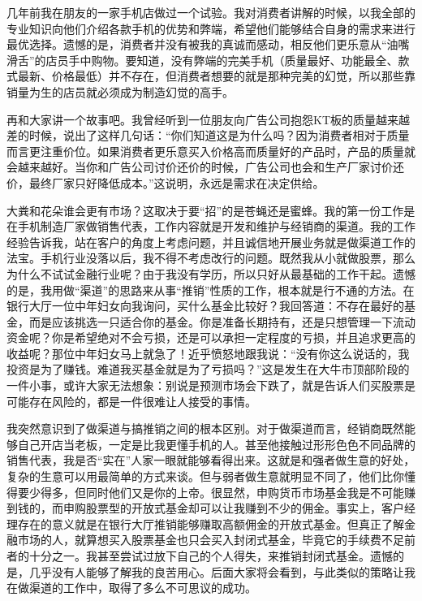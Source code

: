 几年前我在朋友的一家手机店做过一个试验。我对消费者讲解的时候，以我全部的专业知识向他们介绍各款手机的优势和弊端，希望他们能够结合自身的需求来进行最优选择。遗憾的是，消费者并没有被我的真诚而感动，相反他们更乐意从“油嘴滑舌”的店员手中购物。要知道，没有弊端的完美手机（质量最好、功能最全、款式最新、价格最低）并不存在，但消费者想要的就是那种完美的幻觉，所以那些靠销量为生的店员就必须成为制造幻觉的高手。

再和大家讲一个故事吧。我曾经听到一位朋友向广告公司抱怨KT板的质量越来越差的时候，说出了这样几句话：“你们知道这是为什么吗？因为消费者相对于质量而言更注重价位。如果消费者更乐意买入价格高而质量好的产品时，产品的质量就会越来越好。当你和广告公司讨价还价的时候，广告公司也会和生产厂家讨价还价，最终厂家只好降低成本。”这说明，永远是需求在决定供给。

大粪和花朵谁会更有市场？这取决于要“招”的是苍蝇还是蜜蜂。我的第一份工作是在手机制造厂家做销售代表，工作内容就是开发和维护与经销商的渠道。我的工作经验告诉我，站在客户的角度上考虑问题，并且诚信地开展业务就是做渠道工作的法宝。手机行业没落以后，我不得不考虑改行的问题。既然我从小就做股票，那么为什么不试试金融行业呢？由于我没有学历，所以只好从最基础的工作干起。遗憾的是，我用做“渠道”的思路来从事“推销”性质的工作，根本就是行不通的方法。在银行大厅一位中年妇女向我询问，买什么基金比较好？我回答道：不存在最好的基金，而是应该挑选一只适合你的基金。你是准备长期持有，还是只想管理一下流动资金呢？你是希望绝对不会亏损，还是可以承担一定程度的亏损，并且追求更高的收益呢？那位中年妇女马上就急了！近乎愤怒地跟我说：“没有你这么说话的，我投资是为了赚钱。难道我买基金就是为了亏损吗？”这是发生在大牛市顶部阶段的一件小事，或许大家无法想象：别说是预测市场会下跌了，就是告诉人们买股票是可能存在风险的，都是一件很难让人接受的事情。

我突然意识到了做渠道与搞推销之间的根本区别。对于做渠道而言，经销商既然能够自己开店当老板，一定是比我更懂手机的人。甚至他接触过形形色色不同品牌的销售代表，我是否“实在”人家一眼就能够看得出来。这就是和强者做生意的好处，复杂的生意可以用最简单的方式来谈。但与弱者做生意就明显不同了，他们比你懂得要少得多，但同时他们又是你的上帝。很显然，申购货币市场基金我是不可能赚到钱的，而申购股票型的开放式基金却可以让我赚到不少的佣金。事实上，客户经理存在的意义就是在银行大厅推销能够赚取高额佣金的开放式基金。但真正了解金融市场的人，就算想买入股票基金也只会买入封闭式基金，毕竟它的手续费不足前者的十分之一。我甚至尝试过放下自己的个人得失，来推销封闭式基金。遗憾的是，几乎没有人能够了解我的良苦用心。后面大家将会看到，与此类似的策略让我在做渠道的工作中，取得了多么不可思议的成功。

